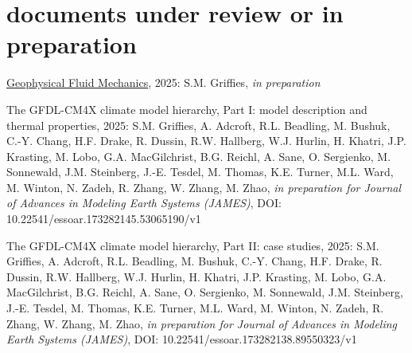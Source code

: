 \section*{\sc \color{Maroon} documents under review or in preparation}

\small 

\begin{etaremune}

\item \href{https://stephengriffies.github.io/assets/pdfs/GFM_lectures.pdf}{Geophysical Fluid Mechanics}, 2025: S.M. Grif\/f\/ies, {\it in preparation}


\item The GFDL-CM4X climate model hierarchy, Part I: model description and thermal properties, 2025: 
S.M. Grif\/f\/ies, A. Adcroft, %
R.L. Beadling, M. Bushuk, C.-Y. Chang, H.F. Drake, R. Dussin, R.W. Hallberg, 
W.J. Hurlin, H. Khatri, J.P. Krasting, M. Lobo, G.A. MacGilchrist, 
B.G. Reichl, A. Sane, O. Sergienko, M. Sonnewald,  J.M. Steinberg, J.-E. Tesdel, M. Thomas, K.E. Turner, M.L. Ward, M. Winton, N. Zadeh, R. Zhang, W. Zhang, M. Zhao, {\it in preparation for Journal of Advances in Modeling Earth Systems (JAMES)}, DOI: 10.22541/essoar.173282145.53065190/v1

\item The GFDL-CM4X climate model hierarchy, Part II: case studies, 2025: S.M. Grif\/f\/ies, A. Adcroft, %
R.L. Beadling, M. Bushuk, C.-Y. Chang, H.F. Drake, R. Dussin, R.W. Hallberg, 
W.J. Hurlin, H. Khatri, J.P. Krasting, M. Lobo, G.A. MacGilchrist, 
B.G. Reichl, A. Sane, O. Sergienko, M. Sonnewald,  J.M. Steinberg, J.-E. Tesdel, M. Thomas, K.E. Turner, M.L. Ward, M. Winton, N. Zadeh, R. Zhang, W. Zhang, M. Zhao, {\it in preparation for Journal of Advances in Modeling Earth Systems (JAMES)}, 
DOI: 10.22541/essoar.173282138.89550323/v1



\end{etaremune}
